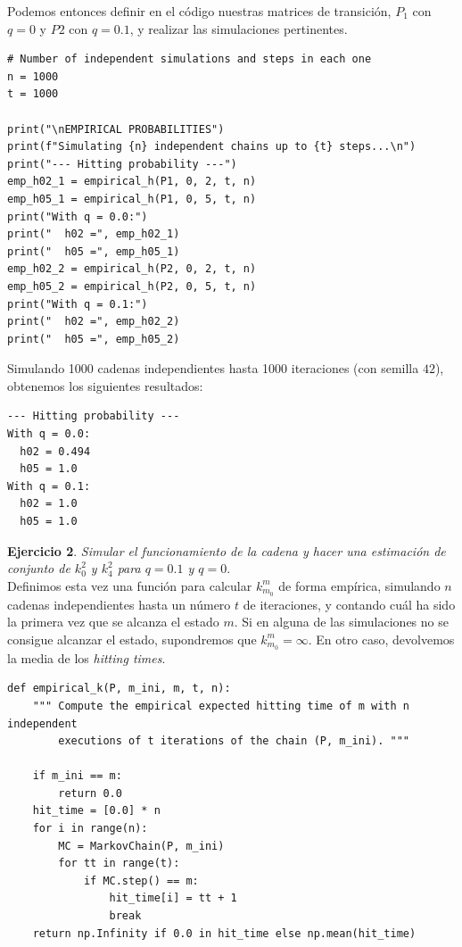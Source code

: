 \documentclass[11pt,a4paper]{article}
\begin{document}
Podemos entonces definir en el código nuestras matrices de transición, $P_1$ con $q=0$ y $P2$ con $q=0.1$, y realizar las simulaciones pertinentes.

\begin{verbatim}
# Number of independent simulations and steps in each one
n = 1000
t = 1000

print("\nEMPIRICAL PROBABILITIES")
print(f"Simulating {n} independent chains up to {t} steps...\n")
print("--- Hitting probability ---")
emp_h02_1 = empirical_h(P1, 0, 2, t, n)
emp_h05_1 = empirical_h(P1, 0, 5, t, n)
print("With q = 0.0:")
print("  h02 =", emp_h02_1)
print("  h05 =", emp_h05_1)
emp_h02_2 = empirical_h(P2, 0, 2, t, n)
emp_h05_2 = empirical_h(P2, 0, 5, t, n)
print("With q = 0.1:")
print("  h02 =", emp_h02_2)
print("  h05 =", emp_h05_2)
\end{verbatim}

Simulando 1000 cadenas independientes hasta 1000 iteraciones (con semilla $42$), obtenemos los siguientes resultados:

\begin{verbatim}
--- Hitting probability ---
With q = 0.0:
  h02 = 0.494
  h05 = 1.0
With q = 0.1:
  h02 = 1.0
  h05 = 1.0
\end{verbatim}

\textbf{Ejercicio 2}. \textit{Simular el funcionamiento de la cadena y hacer una estimación de conjunto de $k_0^2$ y $k_4^2$ para $q=0.1$ y $q=0$}.\\

Definimos esta vez una función para calcular $k_{m_0}^m$ de forma empírica, simulando $n$ cadenas independientes hasta un número $t$ de iteraciones, y contando cuál ha sido la primera vez que se alcanza el estado $m$. Si en alguna de las simulaciones no se consigue alcanzar el estado, supondremos que $k_{m_0}^m=\infty$. En otro caso, devolvemos la media de los \textit{hitting times}.

\begin{verbatim}
def empirical_k(P, m_ini, m, t, n):
    """ Compute the empirical expected hitting time of m with n independent
        executions of t iterations of the chain (P, m_ini). """

    if m_ini == m:
        return 0.0
    hit_time = [0.0] * n
    for i in range(n):
        MC = MarkovChain(P, m_ini)
        for tt in range(t):
            if MC.step() == m:
                hit_time[i] = tt + 1
                break
    return np.Infinity if 0.0 in hit_time else np.mean(hit_time)
\end{verbatim}
\end{document}
